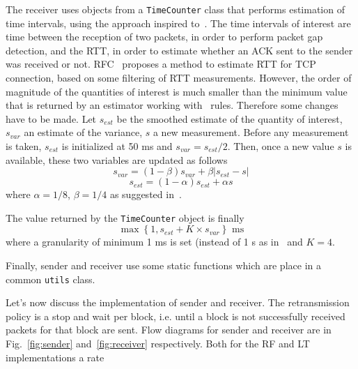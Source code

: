 The receiver uses objects from a \texttt{TimeCounter} class that performs estimation of time intervals, using the approach inspired to~\cite{rfc6298}. The time intervals of interest are time between the reception of two packets, in order to perform packet gap detection, and the RTT, in order to estimate whether an ACK sent to the sender was received or not. RFC~\cite{rfc6298} proposes a method to estimate RTT for TCP connection, based on some filtering of RTT measurements. However, the order of magnitude of the quantities of interest is much smaller than the minimum value that is returned by an estimator working with~\cite{rfc6298} rules. Therefore some changes have to be made. Let $s_{est}$ be the smoothed estimate of the quantity of interest, $s_{var}$ an estimate of the variance, $s$ a new measurement. Before any measurement is taken, $s_{est}$ is initialized at 50 ms and $s_{var} = s_{est}/2$. Then, once a new value $s$ is available, these two variables are updated as follows
\begin{equation}
	s_{var} = (1-\beta) s_{var}  + \beta |s_{est} - s|
\end{equation}
\begin{equation}
	s_{est} = (1 - \alpha) s_{est} + \alpha s
\end{equation}
where $\alpha = 1/8$, $\beta = 1/4$ as suggested in~\cite{rfc6298}.

The value returned by the \texttt{TimeCounter} object is finally
\begin{equation}
	\max\left\{1, s_{est} + K\times s_{var}  \right\} \mbox{ ms}
\end{equation}
where a granularity of minimum 1 ms is set (instead of 1 s as in~\cite{rfc6298} and $K = 4$. 

Finally, sender and receiver use some static functions which are place in a common \texttt{utils} class. 

Let's now discuss the implementation of sender and receiver. The retransmission policy is a stop and wait per block, i.e. until a block is not successfully received packets for that block are sent. Flow diagrams for sender and receiver are in Fig.~\ref{fig:sender} and~\ref{fig:receiver} respectively. Both for the RF and LT implementations a rate 

